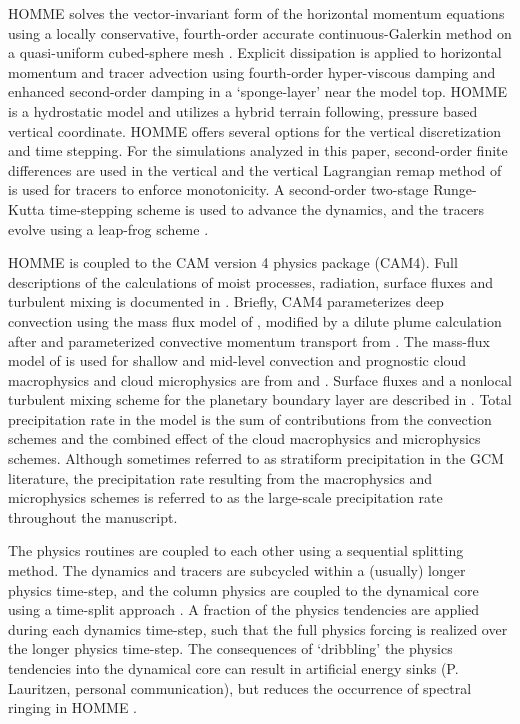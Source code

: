 HOMME solves the vector-invariant form of the horizontal momentum equations using a locally conservative, fourth-order accurate continuous-Galerkin method on a quasi-uniform cubed-sphere mesh \citep{TF2010JCP,DetAl2012IJHPCA}. Explicit dissipation is applied to horizontal momentum and tracer advection using fourth-order hyper-viscous damping and enhanced second-order damping in a ‘sponge-layer’ near the model top. HOMME is a hydrostatic model and utilizes a hybrid terrain following, pressure based vertical coordinate. HOMME offers several options for the vertical discretization and time stepping. For the simulations analyzed in this paper, second-order finite differences are used in the vertical \citep{SB1981MWR} and the vertical Lagrangian remap method of \cite{L2004MWR} is used for tracers to enforce monotonicity. A second-order two-stage Runge-Kutta time-stepping scheme is used to advance the dynamics, and the tracers evolve using a leap-frog scheme \citep{TF2010JCP,DetAl2012IJHPCA}. 

HOMME is coupled to the CAM version 4 physics package (CAM4). Full descriptions of the calculations of moist processes, radiation, surface fluxes and turbulent mixing is documented in \cite{CAM4}. Briefly, CAM4 parameterizes deep convection using the mass flux model of \cite{ZM1995AO}, modified by a dilute plume calculation after \cite{RB1992JAS} and parameterized convective momentum transport from \cite{RR2008JC}. The mass-flux model of \cite{H1994JGR} is used for shallow and mid-level convection and prognostic cloud macrophysics and cloud microphysics are from \cite{RK1998JCLIM} and \cite{ZETAL2003JGR}. Surface fluxes and a nonlocal turbulent mixing scheme for the planetary boundary layer are described in \cite{HB1993JCLIM}. Total precipitation rate in the model is the sum of contributions from the convection schemes and the combined effect of the cloud macrophysics and microphysics schemes. Although sometimes referred to as stratiform precipitation in the GCM literature, the precipitation rate resulting from the macrophysics and microphysics schemes is referred to as the large-scale precipitation rate throughout the manuscript. 

The physics routines are coupled to each other using a sequential splitting method. The dynamics and tracers are subcycled within a (usually) longer physics time-step, and the column physics are coupled to the dynamical core using a time-split approach \citep{CAM5}. A fraction of the physics tendencies are applied during each dynamics time-step, such that the full physics forcing is realized over the longer physics time-step. The consequences of ‘dribbling’ the physics tendencies into the dynamical core can result in artificial energy sinks (P. Lauritzen, personal communication), but reduces the occurrence of spectral ringing in HOMME \citep{TJ2016GMD}.

